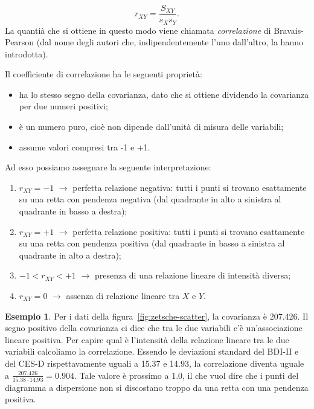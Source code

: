 \documentclass[
  10pt,
  italian,
  a4paper,
  extrafontsizes,onecolumn,openright
  ]{memoir}
\providecommand{\tightlist}{%
  \setlength{\itemsep}{0pt}\setlength{\parskip}{0pt}}
\newlength{\rf}
\theoremstyle{definition}
\theoremstyle{definition}
\newtheorem{example}{Esempio}[chapter]
\theoremstyle{definition}
\theoremstyle{definition}
\theoremstyle{remark}
\begin{document}
\begin{equation}
r_{XY} = \frac{S_{XY}}{s_X s_Y}.
\label{eq:correlation}
\end{equation}
La quantià che si ottiene in questo modo viene chiamata \emph{correlazione} di Bravais-Pearson (dal nome degli autori che, indipendentemente l'uno dall'altro, la hanno introdotta).

Il coefficiente di correlazione ha le seguenti proprietà:

\begin{itemize}
\tightlist
\item
  ha lo stesso segno della covarianza, dato che si ottiene dividendo
  la covarianza per due numeri positivi;
\item
  è un numero puro, cioè non dipende dall'unità di misura delle
  variabili;
\item
  assume valori compresi tra -1 e +1.
\end{itemize}

Ad esso possiamo assegnare la seguente interpretazione:

\begin{enumerate}
\def\labelenumi{\arabic{enumi}.}
\tightlist
\item
  \(r_{XY} = -1\) \(\rightarrow\) perfetta relazione negativa: tutti i
  punti si trovano esattamente su una retta con pendenza negativa (dal
  quadrante in alto a sinistra al quadrante in basso a destra);
\item
  \(r_{XY} = +1\) \(\rightarrow\) perfetta relazione positiva: tutti i
  punti si trovano esattamente su una retta con pendenza positiva (dal
  quadrante in basso a sinistra al quadrante in alto a destra);
\item
  \(-1 < r_{XY} < +1\) \(\rightarrow\) presenza di una relazione lineare
  di intensità diversa;
\item
  \(r_{XY} = 0\) \(\rightarrow\) assenza di relazione lineare tra \(X\) e
  \(Y\).
\end{enumerate}

\begin{example}
Per i dati della figura~\ref{fig:zetsche-scatter}, la covarianza è 207.426. Il segno positivo della covarianza ci dice che tra le due variabili c'è un'associazione lineare positiva. Per capire qual è l'intensità della relazione lineare tra le due variabili calcoliamo la correlazione.
Essendo le deviazioni standard del BDI-II e del CES-D rispettavamente uguali a 15.37 e 14.93, la correlazione diventa uguale a \(\frac{207.426}{15.38 \cdot 14.93} = 0.904.\) Tale valore è prossimo a 1.0, il che vuol dire che i punti del diagramma a dispersione non si discostano troppo da una retta con una pendenza positiva.
\end{example}
\end{document}
